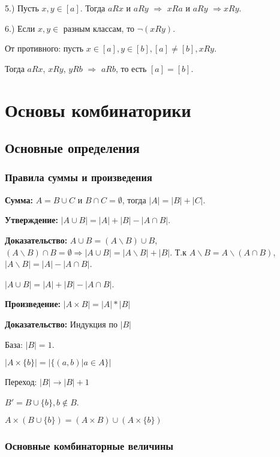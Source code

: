\documentclass[openany]{article}
\begin{document}
   5.) Пусть $x, y \in [a]$. Тогда $aRx$ и $aRy$ $\Rightarrow$ $xRa$ и $aRy$ $\Rightarrow xRy$.

   6.) Если $x, y \in$ разным классам, то $\neg(xRy)$.

   От противного: пусть $x \in [a], y \in [b], [a] \neq [b], xRy$.

   Тогда $aRx$, $xRy$, $yRb$ $\Rightarrow$ $aRb$, то есть $[a] = [b]$.

   \section{Основы комбинаторики}

   \subsection{Основные определения}

   \subsubsection{Правила суммы и произведения}

   \textbf{Сумма:} $A = B \cup C$ и $B \cap C = \emptyset$, тогда $|A| = |B| + |C|$.

   \textbf{Утверждение:} $|A \cup B| = |A| + |B| - |A \cap B|$.

   \textbf{Доказательство:} $A \cup B = (A \backslash B) \cup B$, $(A \backslash B) \cap B = \emptyset \Rightarrow |A \cup B| = |A \backslash B| + |B|$. Т.к $A \backslash B = A \backslash (A \cap B)$, $|A \backslash B| = |A| - |A \cap B|$.

   $|A \cup B| = |A| + |B| - |A \cap B|$.

   \textbf{Произведение:} $|A \times B| = |A| * |B|$

   \textbf{Доказательство:} Индукция по $|B|$

   База: $|B| = 1$.

   $|A \times \{b\}| = |\{(a, b) | a \in A\}|$

   Переход: $|B| \rightarrow |B| + 1$

   $B' = B \cup \{b\}, b \notin B$.

   $A \times (B \cup \{b\}) = (A \times B) \cup (A \times \{b\})$

   \subsubsection{Основные комбинаторные величины}
\end{document}
